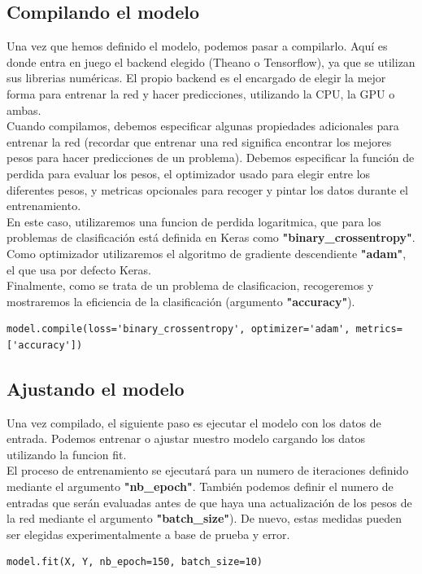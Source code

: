 \subsection{Compilando el modelo}
Una vez que hemos definido el modelo, podemos pasar a compilarlo. Aquí es donde entra en juego el backend elegido (Theano o Tensorflow), ya que se utilizan sus librerias numéricas. El propio backend es el encargado de elegir la mejor forma para entrenar la red y hacer predicciones, utilizando la CPU, la GPU o ambas.\\
Cuando compilamos, debemos especificar algunas propiedades adicionales para entrenar la red (recordar que entrenar una red significa encontrar los mejores pesos para hacer predicciones de un problema). Debemos especificar la función de perdida para evaluar los pesos, el optimizador usado para elegir entre los diferentes pesos, y metricas opcionales para recoger y pintar los datos durante el entrenamiento.\\
En este caso, utilizaremos una funcion de perdida logaritmica, que para los problemas de clasificación está definida en Keras como \textbf{"binary\_crossentropy"}. Como optimizador utilizaremos el algoritmo de gradiente descendiente \textbf{"adam"}, el que usa por defecto Keras.\\
Finalmente, como se trata de un problema de clasificacion, recogeremos y mostraremos la eficiencia de la clasificación (argumento \textbf{"accuracy"}).

\begin{verbatim}
model.compile(loss='binary_crossentropy', optimizer='adam', metrics=['accuracy'])
\end{verbatim}

\subsection{Ajustando el modelo}
Una vez compilado, el siguiente paso es ejecutar el modelo con los datos de entrada. Podemos entrenar o ajustar nuestro modelo cargando los datos utilizando la funcion fit.\\
El proceso de entrenamiento se ejecutará para un numero de iteraciones definido mediante el argumento \textbf{"nb\_epoch"}. También podemos definir el numero de entradas que serán evaluadas antes de que haya una actualización de los pesos de la red mediante el argumento \textbf{"batch\_size"}). De nuevo, estas medidas pueden ser elegidas experimentalmente a base de prueba y error.
\begin{verbatim}
model.fit(X, Y, nb_epoch=150, batch_size=10)
\end{verbatim}

